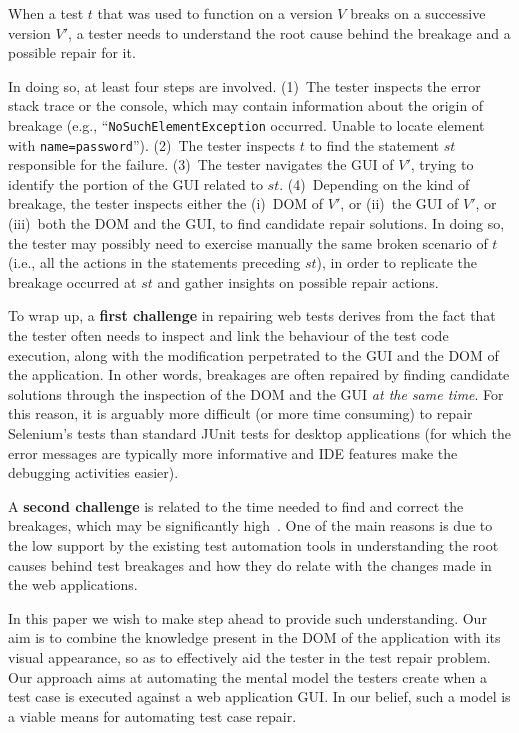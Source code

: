 When a test $t$ that was used to function on a version $V$  breaks on a successive version $V'$, a tester needs to understand the root cause behind the breakage and a possible repair for it. 

In doing so, at least four steps are involved. 
(1)~The tester inspects the error stack trace or the console, which may contain information about the origin of breakage (e.g., ``\texttt{NoSuchElementException} occurred. Unable to locate element with \mbox{\texttt{name=password}}''). 
(2)~The tester inspects $t$ to find the statement $st$ responsible for the failure. %
(3)~The tester navigates the GUI of $V'$, trying to identify the portion of the GUI related to $st$. 
(4)~Depending on the kind of breakage, the tester inspects either the (i)~DOM of $V'$, or (ii)~the GUI of $V'$, or (iii)~both the DOM and the GUI, to find candidate repair solutions. In doing so, the tester may possibly need to exercise manually the same broken scenario of $t$ (i.e., all the actions in the statements preceding $st$), in order to replicate the breakage occurred at $st$ and gather insights on possible repair actions.

To wrap up, a \textbf{first challenge} in repairing web tests derives from the fact that  
the tester often needs to inspect and link the behaviour of the test code execution, along with the modification perpetrated to the GUI and the DOM of the application. 
In other words, breakages are often repaired by finding candidate solutions through the inspection of the DOM and the GUI \textit{at the same time}.
For this reason, it is arguably more difficult (or more time consuming) to repair Selenium's tests than standard JUnit tests for desktop applications (for which the error messages are typically more informative and IDE features make the debugging activities easier).

A \textbf{second challenge} is related to the time needed to find and correct the breakages, which may be significantly high~\cite{Leotta-TAIC-2013,JAMAICA2013}. One of the main reasons is due to the low support by the existing test automation tools in understanding the root causes behind test breakages and how they do relate with the changes made in the web applications. 

In this paper we wish to make step ahead to provide such understanding. 
Our aim is to combine the knowledge present in the DOM of the application with its visual appearance, so as to effectively aid the tester in the test repair problem. Our approach aims at automating the mental model the testers create when a test case is executed against a web application GUI. In our belief, such a model is a viable means for automating test case repair.

